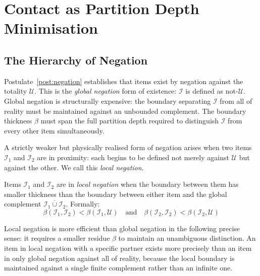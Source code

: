 
\section{Contact as Partition Depth Minimisation}
\label{sec:contact}

\subsection{The Hierarchy of Negation}
\label{subsec:neg_hierarchy}

Postulate~\ref{post:negation} establishes that items exist by negation against
the totality $\mathcal{U}$. This is the \emph{global negation} form of
existence: $\mathcal{I}$ is defined as not-$\mathcal{U}$. Global negation is
structurally expensive: the boundary separating $\mathcal{I}$ from all of
reality must be maintained against an unbounded complement. The boundary
thickness $\beta$ must span the full partition depth required to distinguish
$\mathcal{I}$ from every other item simultaneously.

A strictly weaker but physically realised form of negation arises when two
items $\mathcal{I}_1$ and $\mathcal{I}_2$ are in proximity: each begins to be
defined not merely against $\mathcal{U}$ but against the other. We call this
\emph{local negation}.

\begin{definition}
\label{def:local_neg}
Items $\mathcal{I}_1$ and $\mathcal{I}_2$ are in \emph{local negation} when
the boundary between them has smaller thickness than the boundary between either
item and the global complement $\overline{\mathcal{I}_1 \cup \mathcal{I}_2}$.
Formally:
\begin{equation}
    \beta(\mathcal{I}_1, \mathcal{I}_2) < \beta(\mathcal{I}_1, \mathcal{U})
    \quad \text{and} \quad
    \beta(\mathcal{I}_2, \mathcal{I}_2) < \beta(\mathcal{I}_2, \mathcal{U})
    \label{eq:local_neg}
\end{equation}
\end{definition}

Local negation is more efficient than global negation in the following precise
sense: it requires a smaller residue $\beta$ to maintain an unambiguous
distinction. An item in local negation with a specific partner exists more
precisely than an item in only global negation against all of reality, because
the local boundary is maintained against a single finite complement rather than
an infinite one.

